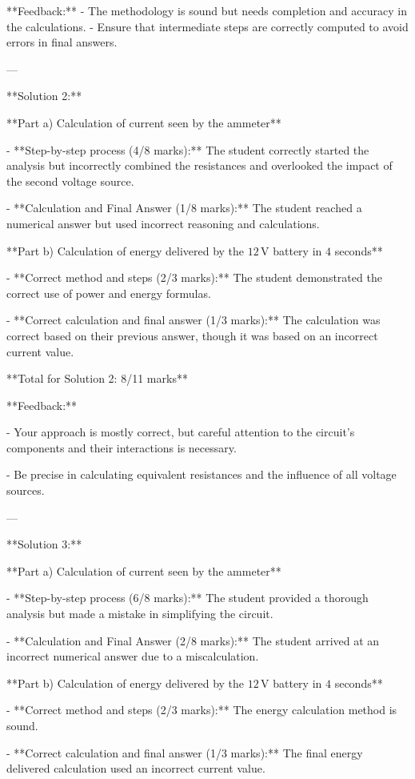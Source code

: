 \documentclass[a4paper,11pt]{article}
\begin{document}
**Feedback:**
- The methodology is sound but needs completion and accuracy in the calculations.
- Ensure that intermediate steps are correctly computed to avoid errors in final answers.

---

**Solution 2:**

**Part a) Calculation of current seen by the ammeter**

- **Step-by-step process (4/8 marks):** The student correctly started the analysis but incorrectly combined the resistances and overlooked the impact of the second voltage source.

- **Calculation and Final Answer (1/8 marks):** The student reached a numerical answer but used incorrect reasoning and calculations.

**Part b) Calculation of energy delivered by the \(12\, \text{V}\) battery in \(4\) seconds**

- **Correct method and steps (2/3 marks):** The student demonstrated the correct use of power and energy formulas.

- **Correct calculation and final answer (1/3 marks):** The calculation was correct based on their previous answer, though it was based on an incorrect current value.

**Total for Solution 2: 8/11 marks**

**Feedback:**

- Your approach is mostly correct, but careful attention to the circuit's components and their interactions is necessary.

- Be precise in calculating equivalent resistances and the influence of all voltage sources.

---

**Solution 3:**

**Part a) Calculation of current seen by the ammeter**

- **Step-by-step process (6/8 marks):** The student provided a thorough analysis but made a mistake in simplifying the circuit.

- **Calculation and Final Answer (2/8 marks):** The student arrived at an incorrect numerical answer due to a miscalculation.

**Part b) Calculation of energy delivered by the \(12\, \text{V}\) battery in \(4\) seconds**

- **Correct method and steps (2/3 marks):** The energy calculation method is sound.

- **Correct calculation and final answer (1/3 marks):** The final energy delivered calculation used an incorrect current value.
\end{document}
